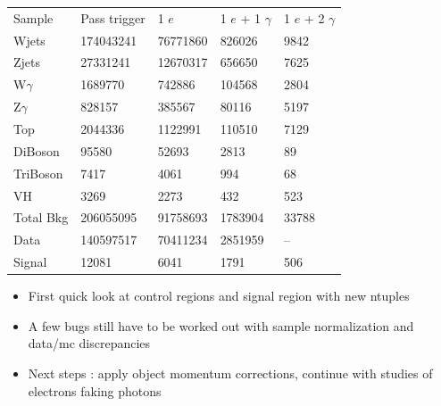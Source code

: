 \documentclass{beamer}
\begin{document}
 {

    \scriptsize
    \begin{tabular}{l | l | l | l | l |}
    Sample    & Pass trigger & 1 $e$   & 1 $e$ + 1 $\gamma$ & 1 $e$ + 2 $\gamma$ \\
    Wjets     & 174043241    & 76771860  & 826026  & 9842                        \\
    Zjets     & 27331241     & 12670317  & 656650  & 7625                        \\
    W$\gamma$ & 1689770      &  742886   & 104568  & 2804                        \\
    Z$\gamma$ & 828157       & 385567    & 80116   & 5197                        \\
    Top       & 2044336      & 1122991   & 110510  & 7129                        \\
    DiBoson   & 95580        & 52693     & 2813    & 89                        \\
    TriBoson  & 7417         & 4061      & 994     & 68                        \\
    VH        & 3269         & 2273      & 432     & 523                        \\
    Total Bkg & 206055095    & 91758693  & 1783904 & 33788                        \\
    Data      & 140597517    & 70411234  & 2851959 &   --                      \\
    Signal    & 12081        & 6041      & 1791    & 506                        \\
    \end{tabular}
}

 {

    \begin{itemize}
        \item First quick look at control regions and signal region with new ntuples
        \item A few bugs still have to be worked out with sample normalization and data/mc discrepancies
        \item Next steps : apply object momentum corrections, continue with studies of electrons faking photons
    \end{itemize}
}
\end{document}
